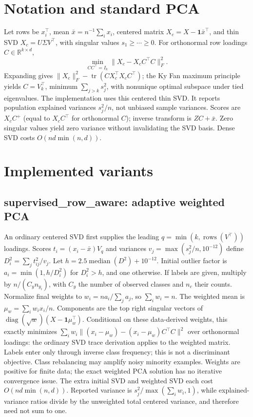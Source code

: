 \documentclass[conference]{IEEEtran}
\begin{document}
\section{Notation and standard PCA}
Let rows be \(x_i^\top\), mean \(\bar x=n^{-1}\sum_i x_i\), centered matrix \(X_c=X-\mathbf1\bar x^\top\), and thin SVD \(X_c=U\Sigma V^\top\), with singular values \(s_1\ge\cdots\ge0\). For orthonormal row loadings \(C\in\mathbb R^{k\times d}\),
\begin{equation}\label{eq:obj}
\min_{CC^\top=I_k}\|X_c-X_cC^\top C\|_F^2.
\end{equation}
Expanding gives \(\|X_c\|_F^2-\operatorname{tr}(CX_c^\top X_cC^\top)\); the Ky Fan maximum principle yields \(C=V_k^\top\), minimum \(\sum_{j>k}s_j^2\), with nonunique optimal subspace under tied eigenvalues. The  implementation uses this centered thin SVD. It reports population explained variances \(s_j^2/n\), not unbiased sample variances. Scores are \(X_cC^+\) (equal to \(X_cC^\top\) for orthonormal \(C\)); inverse transform is \(ZC+\bar x\). Zero singular values yield zero variance without invalidating the SVD basis. Dense SVD costs \(O(nd\min(n,d))\).
\section{Implemented variants}
\subsection{supervised\_row\_aware: adaptive weighted PCA}
An ordinary centered SVD first supplies the leading \(q=\min(k,\operatorname{rows}(V^\top))\) loadings. Scores \(t_i=(x_i-\bar x)V_q\) and variances \(v_j=\max(s_j^2/n,10^{-12})\) define \(D_i^2=\sum_j t_{ij}^2/v_j\). Let \(h=2.5\operatorname{median}(D^2)+10^{-12}\). Initial outlier factor is \(a_i=\min(1,h/D_i^2)\) for \(D_i^2>h\), and one otherwise. If labels are given, multiply by \(n/(C_y n_{y_i})\), with \(C_y\) the number of observed classes and \(n_c\) their counts. Normalize final weights to \(w_i=n a_i/\sum_j a_j\), so \(\sum_iw_i=n\).
The weighted mean is \(\mu_w=\sum_iw_ix_i/n\). Components are the top right singular vectors of \(\operatorname{diag}(\sqrt w)(X-\mathbf1\mu_w^\top)\). Conditional on these data-derived weights, this exactly minimizes \(\sum_iw_i\|(x_i-\mu_w)-(x_i-\mu_w)C^\top C\|^2\) over orthonormal loadings: the ordinary SVD trace derivation applies to the weighted matrix. Labels enter only through inverse class frequency; this is not a discriminant objective. Class rebalancing may amplify noisy minority examples. Weights are positive for finite data; the exact weighted PCA solution has no iterative convergence issue. The extra initial SVD and weighted SVD each cost \(O(nd\min(n,d))\). Reported variance is \(s_j^2/\max(\sum_iw_i,1)\), while explained-variance ratios divide by the unweighted total centered variance, and therefore need not sum to one.
\end{document}
